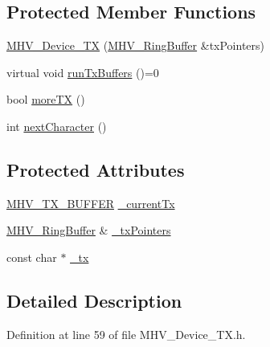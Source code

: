 \subsection*{\-Protected \-Member \-Functions}
\begin{DoxyCompactItemize}
\item 
\hyperlink{class_m_h_v___device___t_x_a71cca6bdbc5f56f9ca161abe4d46e888}{\-M\-H\-V\-\_\-\-Device\-\_\-\-T\-X} (\hyperlink{class_m_h_v___ring_buffer}{\-M\-H\-V\-\_\-\-Ring\-Buffer} \&tx\-Pointers)
\item 
virtual void \hyperlink{class_m_h_v___device___t_x_a3a86067d417c3d5a1f64042ecfcefff7}{run\-Tx\-Buffers} ()=0
\item 
bool \hyperlink{class_m_h_v___device___t_x_a64cba701f06476b494a97620e1a26e86}{more\-T\-X} ()
\item 
int \hyperlink{class_m_h_v___device___t_x_a9e9f436d2b41766db5225c504af96ef5}{next\-Character} ()
\end{DoxyCompactItemize}
\subsection*{\-Protected \-Attributes}
\begin{DoxyCompactItemize}
\item 
\hyperlink{_m_h_v___device___t_x_8h_a8f969362e45e1a805a4a189101bd1f97}{\-M\-H\-V\-\_\-\-T\-X\-\_\-\-B\-U\-F\-F\-E\-R} \hyperlink{class_m_h_v___device___t_x_af2764653ba9f0b2a59bbca39f3987a74}{\-\_\-current\-Tx}
\item 
\hyperlink{class_m_h_v___ring_buffer}{\-M\-H\-V\-\_\-\-Ring\-Buffer} \& \hyperlink{class_m_h_v___device___t_x_a36768491def5fdb4936e918c0ea097cd}{\-\_\-tx\-Pointers}
\item 
const char $\ast$ \hyperlink{class_m_h_v___device___t_x_ace8827a700dcc1a6a54e0bf80906085c}{\-\_\-tx}
\end{DoxyCompactItemize}


\subsection{\-Detailed \-Description}


\-Definition at line 59 of file \-M\-H\-V\-\_\-\-Device\-\_\-\-T\-X.\-h.



